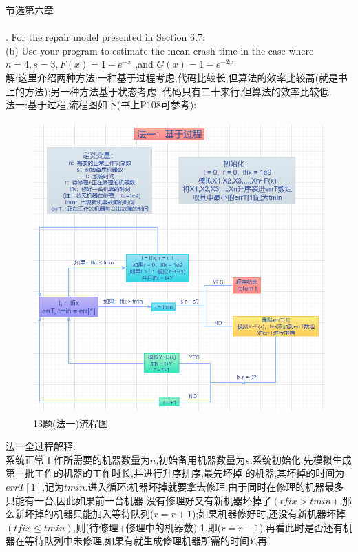 \documentclass{book}
\begin{document}
\centering
节选第六章 \\

\hspace*{\fill} \\
\justifying
{}. For the repair model presented in Section 6.7:  \\
(b) Use your program to estimate the mean crash time in the case where $n=4,s=3,F(x)=1-e^{-x}$
,and $G(x)=1-e^{-2x}$  \\
解:这里介绍两种方法:一种基于过程考虑,代码比较长,但算法的效率比较高(就是书上的方法);另一种方法基于状态考虑,
代码只有二十来行,但算法的效率比较低. \\
法一:基于过程,流程图如下(书上P108可参考): \\
\begin{figure}[H]
    \centering
    \includegraphics*[height = 11.2cm, width = 12cm]{gramFile/十三题/13题(法一)流程图.PNG}
    \caption{13题(法一)流程图}
\end{figure}
\noindent
法一全过程解释: \\
系统正常工作所需要的机器数量为$n$,初始备用机器数量为$s$.系统初始化:先模拟生成第一批工作的机器的工作时长,并进行升序排序,最先坏掉
的机器,其坏掉的时间为$errT[1]$,记为$tmin$.进入循环:机器坏掉就要拿去修理,由于同时在修理的机器最多只能有一台,因此如果前一台机器
没有修理好又有新机器坏掉了$(tfix>tmin)$,那么新坏掉的机器只能加入等待队列($r=r+1$);如果机器修好时,还没有新机器坏掉$(tfix \leq
    tmin)$,则(待修理+修理中的机器数)-1,即($r=r-1$).再看此时是否还有机器在等待队列中未修理,如果有就生成修理机器所需的时间$Y$,再
\end{document}
